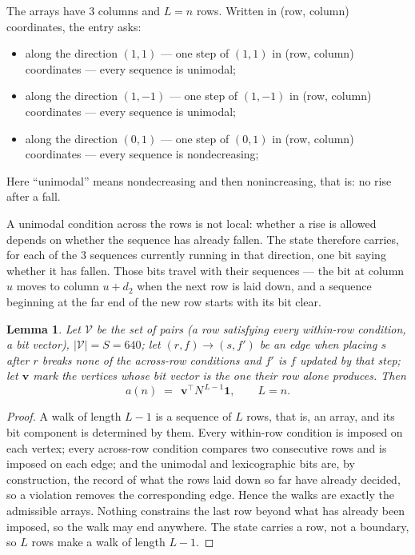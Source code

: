 \documentclass[11pt,a4paper]{article}
\theoremstyle{plain}
\newtheorem{lemma}[theorem]{Lemma}
\theoremstyle{definition}
\begin{document}
The arrays have $3$ columns and $L=n$ rows. Written in (row, column)
coordinates, the entry asks:
\begin{itemize}
\item along the direction $(1,1)$ --- one step of $(1,1)$ in (row, column) coordinates --- every sequence is unimodal;
\item along the direction $(1,-1)$ --- one step of $(1,-1)$ in (row, column) coordinates --- every sequence is unimodal;
\item along the direction $(0,1)$ --- one step of $(0,1)$ in (row, column) coordinates --- every sequence is nondecreasing;
\end{itemize}
Here ``unimodal'' means nondecreasing and then nonincreasing, that is: no rise after a fall.

A unimodal condition across the rows is not local: whether a
rise is allowed depends on whether the sequence has already fallen. The state therefore
carries, for each of the $3$ sequences currently running in that direction, one bit saying
whether it has fallen. Those bits travel with their sequences --- the bit at column $u$
moves to column $u+d_2$ when the next row is laid down, and a sequence beginning at the
far end of the new row starts with its bit clear.

\begin{lemma}\label{lem:walk}
Let $\mathcal V$ be the set of pairs (a row satisfying every within-row condition, a
bit vector), $|\mathcal V|=S=640$; let $(r,f)\to(s,f')$ be an edge when placing $s$ after $r$
breaks none of the across-row conditions and $f'$ is $f$ updated by that step; let
$\mathbf{v}$ mark the vertices whose bit vector is the one their row alone produces.
Then
\[
a(n)\;=\;\,\mathbf{v}^{\!\top}N^{\,L-1}\mathbf{1},\qquad L=n.
\]
\end{lemma}

\begin{proof}
A walk of length $L-1$ is a sequence of $L$ rows, that is, an array, and its bit component
is determined by them. Every within-row condition is imposed on each vertex; every
across-row condition compares two consecutive rows and is imposed on each edge; and the
unimodal and lexicographic bits are, by construction, the record of what the rows laid down
so far have already decided, so a violation removes the corresponding edge. Hence the walks
are exactly the admissible arrays. Nothing constrains the last row beyond what has already
been imposed, so the walk may end anywhere. The state carries a row, not a boundary, so
$L$ rows make a walk of length $L-1$.
\end{proof}
\end{document}
